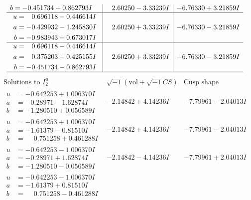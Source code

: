\documentclass[1p]{elsarticle_modified}
\theoremstyle{definition}
\newcommand{\I}{\sqrt{-1}}
\begin{document}
$$\begin{array}{c|c|c}
\begin{aligned}
b &= -0.451734 + 0.862793 I\end{aligned}
 & \phantom{-}2.60250 - 3.33239 I & -6.76330 + 3.21859 I \\ \hline\begin{aligned}
u &= \phantom{-}0.696118 - 0.446614 I \\
a &= -0.429932 - 1.245830 I \\
b &= -0.983943 + 0.673017 I\end{aligned}
 & \phantom{-}2.60250 + 3.33239 I & -6.76330 - 3.21859 I \\ \hline\begin{aligned}
u &= \phantom{-}0.696118 - 0.446614 I \\
a &= \phantom{-}0.375203 + 0.425155 I \\
b &= -0.451734 - 0.862793 I\end{aligned}
 & \phantom{-}2.60250 + 3.33239 I & -6.76330 - 3.21859 I\\
 \hline 
 \end{array}$$\newpage$$\begin{array}{c|c|c}  
\text{Solutions to }I^u_{2}& \I (\text{vol} + \sqrt{-1}CS) & \text{Cusp shape}\\
 \hline 
\begin{aligned}
u &= -0.642253 + 1.006370 I \\
a &= -0.28971 - 1.62874 I \\
b &= -1.280510 + 0.056589 I\end{aligned}
 & -2.14842 + 4.14236 I & -7.79961 - 2.04013 I \\ \hline\begin{aligned}
u &= -0.642253 + 1.006370 I \\
a &= -1.61379 - 0.81510 I \\
b &= \phantom{-}0.751258 + 0.461288 I\end{aligned}
 & -2.14842 + 4.14236 I & -7.79961 - 2.04013 I \\ \hline\begin{aligned}
u &= -0.642253 - 1.006370 I \\
a &= -0.28971 + 1.62874 I \\
b &= -1.280510 - 0.056589 I\end{aligned}
 & -2.14842 - 4.14236 I & -7.79961 + 2.04013 I \\ \hline\begin{aligned}
u &= -0.642253 - 1.006370 I \\
a &= -1.61379 + 0.81510 I \\
b &= \phantom{-}0.751258 - 0.461288 I\end{aligned}

\end{array}$$
\end{document}
